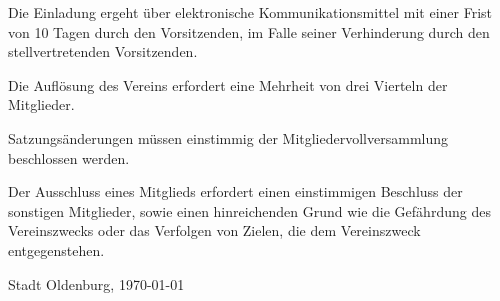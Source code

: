 \documentclass[10pt,a4paper,oneside,parskip=half]{scrartcl}
\begin{document}
\begin{contract}
Die Einladung ergeht über elektronische Kommunikationsmittel mit einer Frist von 10 Tagen durch den Vorsitzenden, im Falle seiner Verhinderung durch den stellvertretenden Vorsitzenden. %

Die Auflösung des Vereins erfordert eine Mehrheit von drei Vierteln der Mitglieder.

Satzungsänderungen müssen einstimmig der Mitgliedervollversammlung beschlossen werden. %

Der Ausschluss eines Mitglieds erfordert einen einstimmigen Beschluss der sonstigen Mitglieder, sowie einen hinreichenden Grund wie die Gefährdung des Vereinszwecks oder das Verfolgen von Zielen, die dem Vereinszweck entgegenstehen.

\end{contract}
\vspace{1cm}
Stadt Oldenburg, \today
\end{document}
